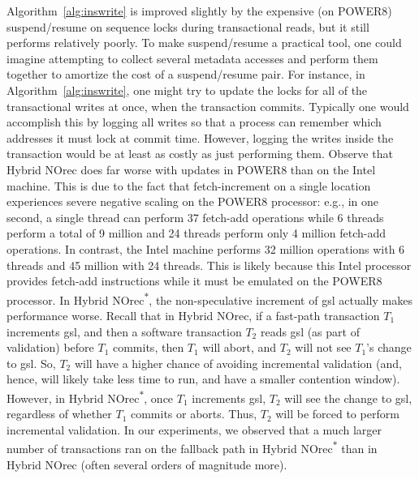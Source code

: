Algorithm~\ref{alg:inswrite} is improved slightly by the expensive (on POWER8) suspend/resume on sequence locks during transactional reads, but it still performs relatively poorly. 
To make suspend/resume a practical tool, one could imagine attempting to 
collect several metadata accesses and perform them together to amortize the cost of a suspend/resume pair. For instance, 
in Algorithm~\ref{alg:inswrite}, one might try to update the locks for all of the transactional writes at once, when the transaction commits. 
Typically one would accomplish this by logging all writes so that a process can remember which addresses it must lock at commit time. 
However, logging the writes inside the transaction would be at least as costly as just performing them.
Observe that Hybrid NOrec does far worse with updates in POWER8 than on the Intel machine.
This is due to the fact that fetch-increment on a single location experiences severe negative scaling on the POWER8 processor: e.g., in one second, a single
thread can perform 37 fetch-add operations while 6 threads perform a total of 9 million and 24 threads perform only 4 million fetch-add operations.
In contrast, the Intel machine performs 32 million operations with 6 threads and 45 million with 24 threads. This is likely because this Intel processor provides 
fetch-add instructions while it must be emulated on the POWER8 processor.
In Hybrid NOrec\textsuperscript{$\ast$}, the non-speculative increment of gsl actually makes performance worse. Recall that in Hybrid NOrec, 
if a fast-path transaction $T_1$ increments gsl, and then a software transaction $T_2$ reads gsl (as part of validation) before $T_1$ commits, then $T_1$ will abort, 
and $T_2$ will not see $T_1$'s change to gsl. 
So, $T_2$ will have a higher chance of avoiding incremental validation (and, hence, will likely take less time to run, and have a smaller contention window).
However, in Hybrid NOrec\textsuperscript{$\ast$}, once $T_1$ increments gsl, $T_2$ will see the change to gsl, regardless of whether $T_1$ commits or aborts. Thus, 
$T_2$ will be forced to perform incremental validation. In our experiments, we observed that a much larger number of transactions ran on 
the fallback path in Hybrid NOrec\textsuperscript{$\ast$} than in Hybrid NOrec (often several orders of magnitude more).
